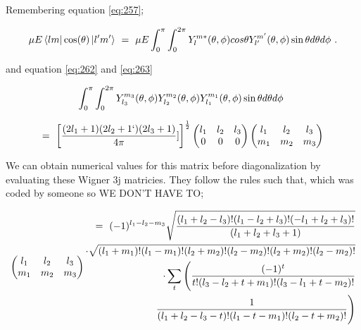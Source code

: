 \documentclass{article}
\begin{document}
Remembering equation \ref{eq:257};

\begin{equation} \label{eq:270}
\mu E\bra{l m}\cos(\theta)\ket{l' m'} \hspace{0.125cm} = \hspace{0.125cm} \mu E \int_{0}^{\pi} \int_{0}^{2\pi} Y_{l}^{m \ast}(\theta, \phi) cos\theta Y_{l'}^{m'}(\theta, \phi) \sin\theta d\theta d\phi \hspace{0.125cm} . 
\end{equation}

and equation \ref{eq:262} and \ref{eq:263}

\begin{equation} \label{eq:271}
\int_{0}^{\pi} \int_{0}^{2\pi} Y_{l_{3}}^{m_{3}}(\theta, \phi) Y_{l_{2}}^{m_{2}}(\theta, \phi) Y_{l_{1}}^{m_{1}}(\theta, \phi) \sin\theta d\theta d\phi \hspace{0.125cm} 
\end{equation}

\begin{equation} \label{eq:272}
= \hspace{0.125cm} \bigg[\frac{(2 l_1 + 1)(2 l_2 + 1`)(2 l_3 + 1)}{4\pi}]\bigg]^{\frac{1}{2}}\begin{pmatrix} l_1 & l_2 & l_3 \\ 0 & 0 & 0 \end{pmatrix}\begin{pmatrix} l_1 & l_2 & l_3 \\ m_1 & m_2 & m_3 \end{pmatrix}
\end{equation}

We can obtain numerical values for this matrix before diagonalization by evaluating these Wigner 3j matricies. They follow the rules such that, which was coded by someone so WE DON'T HAVE TO; 

\begin{equation} \label{eq:273}
\begin{pmatrix} l_1 & l_2 & l_3 \\ m_1 & m_2 & m_3 \end{pmatrix}
\begin{aligned}
= \hspace{0.125cm} (-1)^{l_1 - l_2 - m_3} \sqrt{\frac{(l_1 + l_2 - l_3)!(l_1 - l_2 + l_3)!(-l_1 + l_2 + l_3)!}{(l_1 + l_2 + l_3 + 1)}}  \\ \cdot \sqrt{(l_1 + m_1)!(l_1 - m_1)!(l_2 + m_2)!(l_2 - m_2)!(l_2 + m_2)!(l_2 - m_2)!} \\  \cdot \sum_{t} \Bigg( \frac{(-1)^{t}}{t!(l_3 - l_2 + t + m_1)!(l_3 - l_1 + t - m_2)!} \\ \frac{1}{
(l_1 + l_2 - l_3 - t)!(l_1 - t - m_1)!(l_2 - t + m_2)!} \Bigg)
\end{aligned}
\end{equation}
\end{document}
